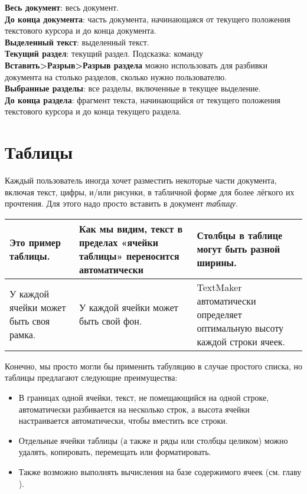 ﻿\documentclass[a4paper,10pt]{article}
\begin{document}
\begin{itemize}
 \textbf{Весь документ}: весь документ.\\
 \textbf{До конца документа}: часть документа, начинающаяся от текущего положения текстового курсора и до конца документа.\\
 \textbf{Выделенный текст}: выделенный текст.\\
 \textbf{Текущий раздел}: текущий раздел. Подсказка: команду \textbf{Вставить>Разрыв>Разрыв раздела} можно использовать для разбивки документа на столько разделов, сколько нужно пользователю.\\
 \textbf{Выбранные разделы}: все разделы, включенные в текущее выделение.\\
 \textbf{До конца раздела}: фрагмент текста, начинающийся от текущего положения текстового курсора и до конца текущего раздела.
\end{itemize}


\section{Таблицы} \label{sec:таблицы}
Каждый пользователь иногда хочет разместить некоторые части документа, включая текст, цифры, и/или рисунки, в табличной форме для более лёгкого их прочтения. Для этого надо просто вставить в документ \textit{таблицу}.

\begin{center}
\begin{tabular}{ | m{4cm} | m{7cm} | m{5cm} |}
\hline
 Это пример таблицы. & Как мы видим, текст в пределах «ячейки таблицы» переносится автоматически & Столбцы в таблице могут быть разной ширины.\\ 
 \hline
 У каждой ячейки может быть своя рамка. & У каждой ячейки может быть свой фон. & TextMaker автоматически определяет оптимальную высоту каждой строки ячеек.\\
\hline
\end{tabular}
\end{center}

Конечно, мы просто могли бы применить табуляцию в случае простого списка, но таблицы предлагают следующие преимущества:
\begin{itemize}
 \item В границах одной ячейки, текст, не помещающийся на одной строке, автоматически разбивается на несколько строк, а высота ячейки настраивается автоматически, чтобы вместить все строки.
 \item Отдельные ячейки таблицы (а также и ряды или столбцы целиком) можно удалять, копировать, перемещать или форматировать.
 \item Также возможно выполнять вычисления на базе содержимого ячеек (см. главу ).
\end{itemize}
\end{document}
